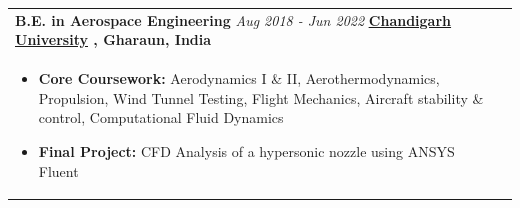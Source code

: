 \documentclass[a4paper,8pt]{article}
\newcommand{\ulhref}[2]{%
  {\hypersetup{urlcolor=.}\textcolor{.}{\href{#1}{\uline{#2}}}}%
}
\begin{document}
\begin{tabularx}{\linewidth}{@{}X r@{}}
\textbf{B.E. in Aerospace Engineering} \hfill \color[HTML]{371e77} \textit{Aug 2018 - Jun 2022}
\newline
\color[HTML]{371e77}\textbf{\ulhref{https://www.cuchd.in/engineering/be-aerospace.php?L_mx_Visit_Source=www.cuchd.in/}{Chandigarh University}, Gharaun, India}\ \hfill \color[HTML]{4B28A4}  \\[1pt]
\begin{minipage}[t]{\linewidth}
    \begin{itemize}[nosep,after=\strut, leftmargin=*, itemsep=1pt]
        \item \textbf{Core Coursework:} Aerodynamics I \& II, Aerothermodynamics, Propulsion, Wind Tunnel Testing, Flight Mechanics, Aircraft stability \& control, Computational Fluid Dynamics
        \item \textbf{Final Project:} CFD Analysis of a hypersonic nozzle using ANSYS Fluent
    \end{itemize}
\end{minipage}
\end{tabularx}
\end{document}
